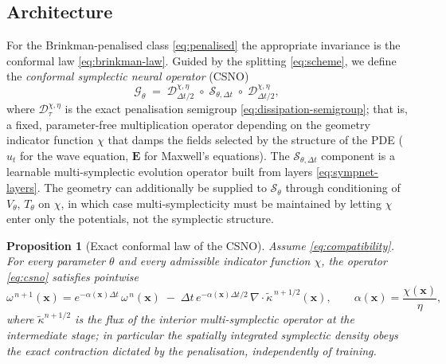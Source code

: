 \documentclass[11pt]{article}
\newtheorem{proposition}[theorem]{Proposition}
\theoremstyle{definition}
\theoremstyle{remark}
\newcommand{\bx}{\bm{x}}
\newcommand{\bE}{\bm{E}}
\newcommand{\chixx}{\chi(\bx)}
\newcommand{\Do}{\mathcal{D}}
\newcommand{\So}{\mathcal{S}}
\newcommand{\Go}{\mathcal{G}}
\begin{document}
\subsection{Architecture}

For the Brinkman-penalised class \eqref{eq:penalised} the appropriate
invariance is the conformal law \eqref{eq:brinkman-law}.  Guided by
the splitting \eqref{eq:scheme}, we define the \emph{conformal
symplectic neural operator} (CSNO)
\begin{equation}
\label{eq:csno}
\Go_\theta
\;=\;
\Do^{\chi,\eta}_{\Delta t/2}
\;\circ\;
\So_{\theta,\Delta t}
\;\circ\;
\Do^{\chi,\eta}_{\Delta t/2},
\end{equation}
where $\Do^{\chi,\eta}_{\tau}$ is the exact penalisation
semigroup \eqref{eq:dissipation-semigroup}; that is, a fixed, parameter-free multiplication operator depending on the geometry indicator function $\chi$ that damps the fields selected by the structure of the PDE ($u_t$ for the wave equation, $\bE$ for
Maxwell's equations). The $\So_{\theta,\Delta t}$ component is a learnable multi-symplectic evolution operator built from layers
\eqref{eq:sympnet-layers}.  The geometry can additionally be supplied
to $\So_\theta$ through conditioning of $V_\theta$, $T_\theta$ on
$\chi$, in which case multi-symplecticity must be maintained by
letting $\chi$ enter only the potentials, not the symplectic
structure.

\begin{proposition}[Exact conformal law of the CSNO]
\label{prop:csno-law}
Assume \eqref{eq:compatibility}.  For every parameter $\theta$ and
every admissible indicator function $\chi$, the operator
\eqref{eq:csno} satisfies pointwise
\begin{equation}
\label{eq:csno-law}
\omega^{\,n+1}(\bx) = e^{-\alpha(\bx)\Delta t}\,\omega^{\,n}(\bx)
\;-\;\Delta t\, e^{-\alpha(\bx)\Delta t/2}\,
\nabla\!\cdot\!\tilde\kappa^{\,n+1/2}(\bx),
\qquad
\alpha(\bx)=\frac{\chixx}{\eta},
\end{equation}
where $\tilde\kappa^{n+1/2}$ is the flux of the interior
multi-symplectic operator at the intermediate stage; in particular the
spatially integrated symplectic density obeys the exact contraction
dictated by the penalisation, independently of training.
\end{proposition}
\end{document}
